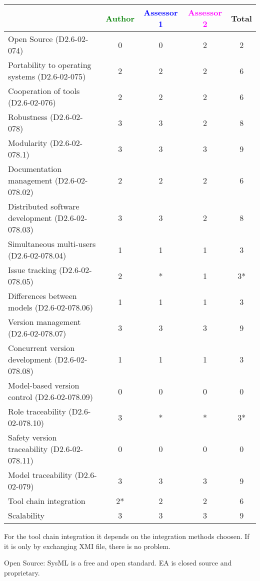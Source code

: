 \begin{tabular}{|l | c | c | c | c|}
\hline
& \textcolor{green}{Author} & \textcolor{blue}{Assessor 1} & \textcolor{magenta}{Assessor 2} & Total \\
\hline 
Open Source (D2.6-02-074) &0 & 0& 2& 2  \\
\hline 
Portability to operating systems (D2.6-02-075) &2 & 2& 2 & 6  \\
\hline
Cooperation of tools (D2.6-02-076) &2 & 2&2 & 6  \\
\hline
Robustness (D2.6-02-078) &3 &3 &2 & 8 \\
\hline
Modularity (D2.6-02-078.1) &3 &3 &3 & 9 \\
\hline
Documentation management (D2.6-02-078.02) & 2& 2&2 & 6 \\
\hline
Distributed software development (D2.6-02-078.03)  &3 & 3&2 & 8 \\
\hline
Simultaneous multi-users (D2.6-02-078.04)   &1 & 1&1 & 3 \\
\hline
Issue tracking (D2.6-02-078.05) &2 & *& 1& 3* \\
\hline
Differences between models (D2.6-02-078.06) &1 & 1&1 & 3 \\
\hline
Version management (D2.6-02-078.07) &3 & 3& 3& 9 \\
\hline
Concurrent version development (D2.6-02-078.08) &1 & 1& 1& 3 \\
\hline
Model-based version control (D2.6-02-078.09) &0 & 0& 0& 0 \\
\hline
Role traceability (D2.6-02-078.10) & 3& *& * & 3* \\
\hline
Safety version traceability (D2.6-02-078.11) &0 &0 & 0& 0 \\
\hline
Model traceability (D2.6-02-079) &3 & 3&3 & 9 \\
\hline
Tool chain integration &2* & 2& 2 & 6 \\
\hline
Scalability &3 & 3&3 & 9 \\
\hline
\end{tabular}
\begin{author_comment}
For the tool chain integration it depends on the integration methods
choosen. If it is only by exchanging XMI file, there is no problem.
\end{author_comment}

\begin{assessor2}
Open Source: SysML is a free and open standard. EA is closed source and proprietary.

\end{assessor2}


